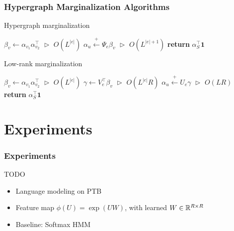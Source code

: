 \documentclass{beamer}
\begin{document}
\begin{frame}
\frametitle{Hypergraph Marginalization Algorithms}
\centering
\begin{algorithm}[H]
\caption{\label{alg:hypergraph-marg} Hypergraph marginalization}
\begin{algorithmic} 
\STATE $\beta_v \gets \alpha_{v_1}\alpha_{v_2}^\top$
    \hfill $\vartriangleright$ $O(L^{|e|})$
\STATE $\alpha_u \stackrel{+}{\gets} \Psi_e\beta_v$
    \hfill $\vartriangleright$ $O(L^{|e|+1})$
\ENDFOR
\STATE \textbf{return} $\alpha_S^\top \mathbf{1}$
\end{algorithmic}

\end{algorithm}

\begin{algorithm}[H]
\caption{\label{alg:low-rank-update} Low-rank marginalization}
\begin{algorithmic} 
\STATE $\beta_v \gets \alpha_{v_1}\alpha_{v_2}^\top$
    \hfill $\vartriangleright$ $O(L^{|e|})$
\STATE $\gamma \gets V_e^\top\beta_v$
    \hfill $\vartriangleright$ $O(L^{|e|}R)$
\STATE $\alpha_u \stackrel{+}{\gets} U_e\gamma $
    \hfill $\vartriangleright$ $O(LR)$
\ENDFOR
\STATE \textbf{return} $\alpha_S^\top\mathbf{1}$
\end{algorithmic} 
\end{algorithm}

\end{frame}


\section{Experiments}

\begin{frame}
\frametitle{Experiments}
TODO
\begin{itemize}
\item Language modeling on PTB
\vspace{2em}
\item Feature map $\phi(U) = \exp\left(U W\right)$,
with learned $W\in\mathbb{R}^{R \times R}$
\vspace{2em}
\item Baseline: Softmax HMM
\end{itemize}
\end{frame}
\end{document}
